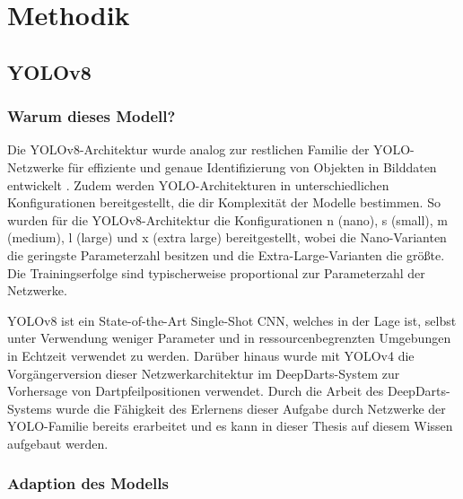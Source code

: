 
\section{Methodik}
\label{sec:ki:methodik}



\subsection{YOLOv8}
\label{sec:warum_yolov8}

\subsubsection{Warum dieses Modell?}

Die YOLOv8-Architektur wurde analog zur restlichen Familie der YOLO-Netzwerke für effiziente und genaue Identifizierung von Objekten in Bilddaten entwickelt \cite{yolov8_paper,adamw_yolo}. Zudem werden YOLO-Architekturen in unterschiedlichen Konfigurationen bereitgestellt, die dir Komplexität der Modelle bestimmen. So wurden für die YOLOv8-Architektur die Konfigurationen n (nano), s (small), m (medium), l (large) und x (extra large) bereitgestellt, wobei die Nano-Varianten die geringste Parameterzahl besitzen und die Extra-Large-Varianten die größte. Die Trainingserfolge sind typischerweise proportional zur Parameterzahl der Netzwerke.


YOLOv8 ist ein State-of-the-Art Single-Shot CNN, welches in der Lage ist, selbst unter Verwendung weniger Parameter und in ressourcenbegrenzten Umgebungen in Echtzeit verwendet zu werden. Darüber hinaus wurde mit YOLOv4 die Vorgängerversion dieser Netzwerkarchitektur im DeepDarts-System zur Vorhersage von Dartpfeilpositionen verwendet. Durch die Arbeit des DeepDarts-Systems wurde die Fähigkeit des Erlernens dieser Aufgabe durch Netzwerke der YOLO-Familie bereits erarbeitet und es kann in dieser Thesis auf diesem Wissen aufgebaut werden.

\subsubsection{Adaption des Modells}
\label{sec:yolo_adaption}

